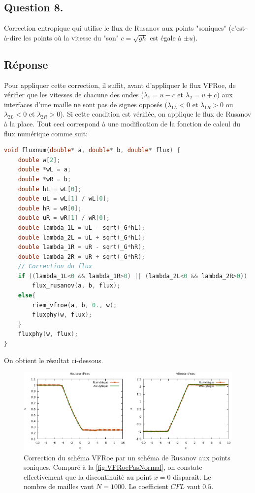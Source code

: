 \documentclass[
	french,
	11pt, %
]{fphw}
\begin{document}
\subsection*{Question 8.}
\begin{problem}
Correction entropique qui utilise le flux de Rusanov aux points "soniques" (c'est-à-dire les points où la vitesse du "son" $c = \sqrt{gh}$ est égale à $ \pm  u$).
\end{problem}

\subsection*{Réponse} 

Pour appliquer cette correction, il suffit, avant d'appliquer le flux VFRoe, de vérifier que les vitesses de chacune des ondes ($\lambda_1 = u - c$ et $\lambda_2 = u + c$) aux interfaces d'une maille ne sont pas de signes opposés ($\lambda_{1L} < 0$ et $\lambda_{1R} > 0$ ou $\lambda_{2L} < 0$ et $\lambda_{2R} > 0$). Si cette condition est vérifiée, on applique le flux de Rusanov à la place. Tout ceci correspond à une modification de la fonction de calcul du flux numérique comme suit:

\begin{lstlisting}[language=C, caption={Application d'une correction entropique qui utilise le flux de Rusanov aux points "soniques".},breaklines]
void fluxnum(double* a, double* b, double* flux) {
	double w[2];       
	double *wL = a;
	double *wR = b;    
	double hL = wL[0];
	double uL = wL[1] / wL[0];
	double hR = wR[0];
	double uR = wR[1] / wR[0];	
	double lambda_1L = uL - sqrt(_G*hL);
	double lambda_2L = uL + sqrt(_G*hL);
	double lambda_1R = uR - sqrt(_G*hR);
	double lambda_2R = uR + sqrt(_G*hR);
	// Correction du flux
    if ((lambda_1L<0 && lambda_1R>0) || (lambda_2L<0 && lambda_2R>0))
        flux_rusanov(a, b, flux);
    else{
        riem_vfroe(a, b, 0., w);
        fluxphy(w, flux);
    }
    fluxphy(w, flux);
}	
\end{lstlisting}
On obtient le résultat ci-dessous.
\begin{figure}[H]
	\centering
	\includegraphics[width=\textwidth]{VFRoeRusanov.png}
	\caption{Correction du schéma VFRoe par un schéma de Rusanov aux points soniques. Comparé à la \cref{fig:VFRoePasNormal}, on constate effectivement que la discontinuité au point $x=0$ disparait. Le nombre de mailles vaut $N=1000$. Le coefficient $CFL$ vaut $0.5$.}
	\label{fig:VFRoeRusanov}
\end{figure}
\end{document}
